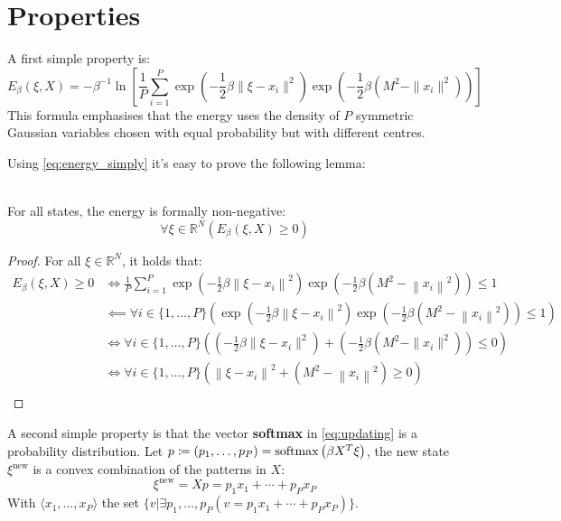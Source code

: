\section{Properties}
A first simple property is:
\begin{equation}
\label{eq:energy_simply}
E_\beta\left(\xi,X\right) = -\beta^{-1}\ln\left[\frac{1}{P}\sum_{i=1}^{P}\exp\left(-\frac12\beta\|\xi-x_i\|^2\right)\exp\left(-\frac12\beta\left(M^2-\|x_i\|^2\right)\right)\right]
\end{equation}
This formula emphasises that the energy uses the density of $P$ symmetric Gaussian variables chosen with equal probability but with different centres.

\noindent Using \cref{eq:energy_simply} it's easy to prove the following lemma:
\begin{lemma}\\
    For all states, the energy is formally non-negative:
    \[
        \forall\xi\in\mathbb{R}^N\left(E_\beta\left(\xi,X\right)\geq0\right)
    \]
    \begin{proof}
        For all $\xi\in\mathbb{R}^N$, it holds that:
        \begin{align*}
            E_\beta\left(\xi,X\right)\geq0 &\iff \frac{1}{P}\sum_{i=1}^{P}\exp\left(-\frac12\beta\left\|\xi-x_i\right\|^2\right)\exp\left(-\frac12\beta\left(M^2-\left\|x_i\right\|^2\right)\right) \leq 1 \\
            &\impliedby \forall{i\in\{1,\ldots,P\}} \left(\exp\left(-\frac12\beta\left\|\xi-x_i\right\|^2\right)\exp\left(-\frac12\beta\left(M^2-\left\|x_i\right\|^2\right)\right)\leq1\right) \\
            &\iff \forall{i\in\{1,\ldots,P\}} \left(\left(-\frac12\beta\|\xi-x_i\|^2\right)+\left(-\frac12\beta\left(M^2-\|x_i\|^2\right)\right)\leq0\right) \\
            &\iff \forall{i\in\{1,\ldots,P\}} \left(\left\|\xi-x_i\right\|^2+\left(M^2-\left\|x_i\right\|^2\right)\geq0\right) \\
        \end{align*}
    \end{proof}
\end{lemma}
A second simple property is that the vector \textbf{softmax} in \cref{eq:updating} is a probability distribution. Let $p \coloneqq \left(p_1,\ldots,p_P\right)=\operatorname{softmax}\left(\beta X^T\xi\right)$, the new state $\xi^{\text{new}}$ is a convex combination of the patterns in $X$:
\[
\xi^{\text{new}} = Xp = p_1x_1+\cdots+p_Px_P
\]
With $\langle{x_1,\ldots,x_P}\rangle$ the set $\{v|\exists p_1,\ldots,p_P\left(v=p_1x_1+\cdots+p_Px_P\right)\}$.

